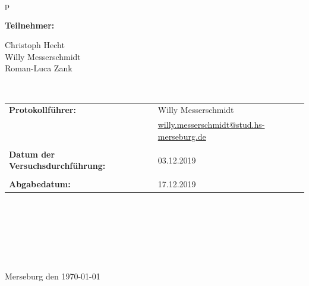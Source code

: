 \begin{center}
\begin{tabular}{p{\textwidth}}
\begin{center}
\Large{\textbf{Teilnehmer:}} \\ 
\end{center}
\begin{center}
\large{Christoph Hecht \\
	Willy Messerschmidt \\
	Roman-Luca Zank} \\
\end{center}


\\

\begin{center}
\begin{tabular}{lll}
\large{\textbf{Protokollführer:}} & & \large{Willy Messerschmidt} \\
& & \href{mailto:willy.messerschmidt@stud.hs-merseburg.de}{{\footnotesize willy.messerschmidt@stud.hs-merseburg.de}}\\
&&\\
\large{\textbf{Datum der Versuchsdurchführung:}}&& \large{03.12.2019}\\
&&\\
\large{\textbf{Abgabedatum:}}&& \large{17.12.2019}
\end{tabular}
\end{center}

\\ \\ \\ \\ \\ \\
\large{Merseburg den \today}

\end{tabular}
\end{center}
